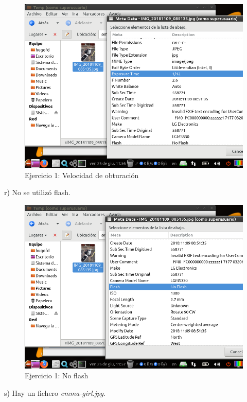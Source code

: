 \documentclass[11pt]{article}
\begin{document}
\begin{figure}[H]
    \caption{Ejercicio 1: Velocidad de obturación}
    \centering
    \includegraphics[scale=0.7]{e1-17.png}
\end{figure}

r) No se utilizó flash.

\begin{figure}[H]
    \caption{Ejercicio 1: No flash}
    \centering
    \includegraphics[scale=0.7]{e1-18.png}
\end{figure}

s) Hay un fichero \textit{emma-girl.jpg}.
\end{document}
